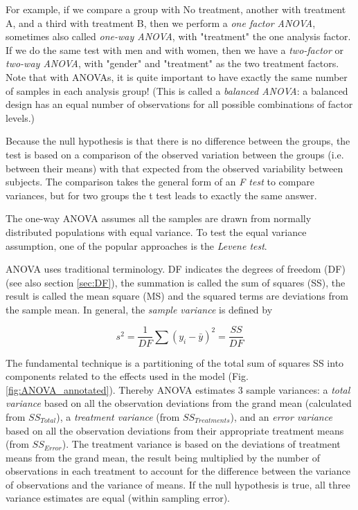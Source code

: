 For example, if we compare a group with No treatment, another with treatment A, and a third with treatment B, then we perform a \emph{one factor ANOVA}, sometimes also called \emph{one-way ANOVA}, with "treatment" the one analysis factor. If we do the same test with men and with women, then we have a \emph{two-factor} or \emph{two-way ANOVA}, with "gender" and "treatment" as the two treatment factors. Note that with ANOVAs, it is quite important to have exactly the same number of samples in each analysis group! (This is called a \emph{balanced ANOVA}: a balanced design has an equal number of observations for all possible combinations of factor levels.)

Because the null hypothesis is that there is no difference between the groups, the test is based on a comparison of the observed variation between the groups (i.e. between their means) with that expected from the observed variability between subjects. The comparison takes the general form of an \emph{F test} to compare variances, but for two groups the t test leads to exactly the same answer.

The one-way ANOVA assumes all the samples are drawn from normally distributed populations with equal variance. To test the equal variance assumption, one of the popular approaches is the \emph{Levene test}.

ANOVA uses traditional terminology. DF indicates the degrees of freedom (DF) (see also section \ref{sec:DF}), the summation is called the sum of squares (SS), the result is called the mean square (MS) and the squared terms are deviations from the sample mean.
In general, the \emph{sample variance} is defined by

\begin{equation}\label{eq:sampleVariance}
  s^2 = \frac{1}{DF} \sum (y_i - \bar{y})^2 = \frac{SS}{DF}
\end{equation}

The fundamental technique is a partitioning of the total sum of squares SS into components related to the effects used in the model (Fig. \ref{fig:ANOVA_annotated}). Thereby ANOVA estimates 3 sample variances: a \emph{total variance} based on all the observation deviations from the grand mean (calculated from $SS_{Total}$), a \emph{treatment variance} (from $SS_{Treatments}$), and an \emph{error variance} based on all the observation deviations from their appropriate treatment means (from $SS_{Error}$). The treatment variance is based on the deviations of treatment means from the grand mean, the result being multiplied by the number of observations in each treatment to account for the difference between the variance of observations and the variance of means. If the null hypothesis is true, all three variance estimates are equal (within sampling error).

